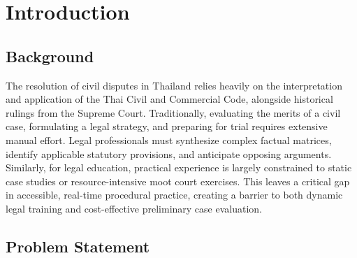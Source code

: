 \chapter{Introduction}
\label{chap:introduction}

\section{Background}
\label{section:background}

The resolution of civil disputes in Thailand relies heavily on the interpretation and application of the Thai Civil and Commercial Code, alongside historical rulings from the Supreme Court. Traditionally, evaluating the merits of a civil case, formulating a legal strategy, and preparing for trial requires extensive manual effort. Legal professionals must synthesize complex factual matrices, identify applicable statutory provisions, and anticipate opposing arguments. Similarly, for legal education, practical experience is largely constrained to static case studies or resource-intensive moot court exercises. This leaves a critical gap in accessible, real-time procedural practice, creating a barrier to both dynamic legal training and cost-effective preliminary case evaluation.
\section{Problem Statement}
\label{section:problem-statement}


